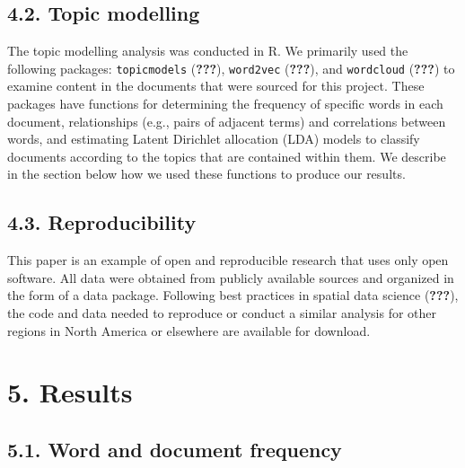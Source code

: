 \documentclass[]{elsarticle} %
\begin{document}
\hypertarget{topic-modelling}{%
\subsection{4.2. Topic modelling}\label{topic-modelling}}

The topic modelling analysis was conducted in R. We primarily used the
following packages: \texttt{topicmodels} ({\textbf{???}}),
\texttt{word2vec} ({\textbf{???}}), and \texttt{wordcloud}
({\textbf{???}}) to examine content in the documents that were sourced
for this project. These packages have functions for determining the
frequency of specific words in each document, relationships (e.g., pairs
of adjacent terms) and correlations between words, and estimating Latent
Dirichlet allocation (LDA) models to classify documents according to the
topics that are contained within them. We describe in the section below
how we used these functions to produce our results.

\hypertarget{reproducibility}{%
\subsection{4.3. Reproducibility}\label{reproducibility}}

This paper is an example of open and reproducible research that uses
only open software. All data were obtained from publicly available
sources and organized in the form of a data package. Following best
practices in spatial data science ({\textbf{???}}), the code and data
needed to reproduce or conduct a similar analysis for other regions in
North America or elsewhere are available for download.

\hypertarget{results}{%
\section{5. Results}\label{results}}

\hypertarget{word-and-document-frequency}{%
\subsection{5.1. Word and document
frequency}\label{word-and-document-frequency}}
\end{document}
